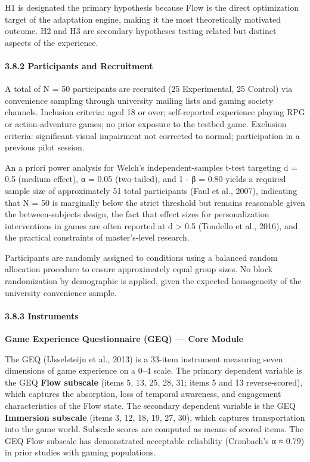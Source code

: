 H1 is designated the primary hypothesis because Flow is the direct
optimization target of the adaptation engine, making it the most
theoretically motivated outcome. H2 and H3 are secondary hypotheses
testing related but distinct aspects of the experience.

\paragraph{3.8.2 Participants and
Recruitment}\label{participants-and-recruitment}

A total of N = 50 participants are recruited (25 Experimental, 25
Control) via convenience sampling through university mailing lists and
gaming society channels. Inclusion criteria: aged 18 or over;
self-reported experience playing RPG or action-adventure games; no prior
exposure to the testbed game. Exclusion criteria: significant visual
impairment not corrected to normal; participation in a previous pilot
session.

An a priori power analysis for Welch's independent-samples t-test
targeting d = 0.5 (medium effect), α = 0.05 (two-tailed), and 1 - β =
0.80 yields a required sample size of approximately 51 total
participants (Faul et al., 2007), indicating that N = 50 is marginally
below the strict threshold but remains reasonable given the
between-subjects design, the fact that effect sizes for personalization
interventions in games are often reported at d \textgreater{} 0.5
(Tondello et al., 2016), and the practical constraints of master's-level
research.

Participants are randomly assigned to conditions using a balanced random
allocation procedure to ensure approximately equal group sizes. No block
randomization by demographic is applied, given the expected homogeneity
of the university convenience sample.

\paragraph{3.8.3 Instruments}\label{instruments}

\textbf{Game Experience Questionnaire (GEQ) --- Core Module}

The GEQ (IJsselsteijn et al., 2013) is a 33-item instrument measuring
seven dimensions of game experience on a 0--4 scale. The primary
dependent variable is the GEQ \textbf{Flow subscale} (items 5, 13, 25,
28, 31; items 5 and 13 reverse-scored), which captures the absorption,
loss of temporal awareness, and engagement characteristics of the Flow
state. The secondary dependent variable is the GEQ \textbf{Immersion
subscale} (items 3, 12, 18, 19, 27, 30), which captures transportation
into the game world. Subscale scores are computed as means of scored
items. The GEQ Flow subscale has demonstrated acceptable reliability
(Cronbach's α ≈ 0.79) in prior studies with gaming populations.

